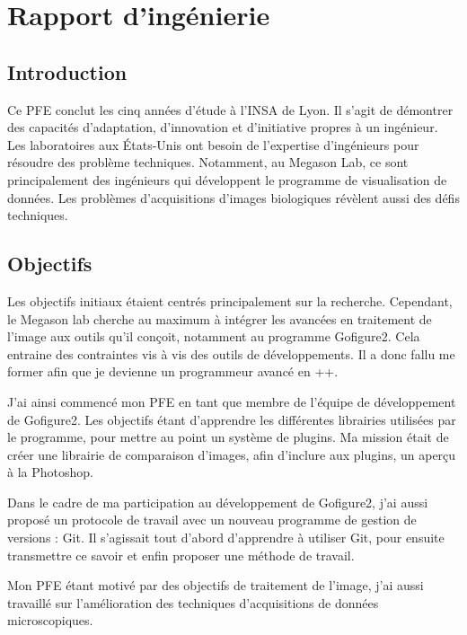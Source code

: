 

\chapter{Rapport d'ingénierie} 








\section*{Introduction}
Ce PFE conclut les cinq années d'étude à l'INSA de Lyon. 
Il s'agit de démontrer des capacités d'adaptation,
d'innovation et d'initiative propres à un ingénieur. Les laboratoires aux 
États-Unis ont besoin de l'expertise d'ingénieurs
pour résoudre des problème techniques. 
Notamment, au Megason Lab, ce sont principalement des ingénieurs qui développent le programme de visualisation de données. 
Les problèmes d'acquisitions d'images biologiques révèlent aussi des défis techniques.
 
\section*{Objectifs}

Les objectifs initiaux étaient centrés principalement sur la recherche.
Cependant, le Megason lab cherche au maximum à intégrer les avancées en traitement de l'image aux outils qu'il conçoit,
 notamment au programme Gofigure2. Cela entraine des contraintes vis à vis des outils de développements. 
 Il a donc fallu me former afin que je devienne un programmeur avancé en {\C++}. 
 
J'ai ainsi commencé mon PFE en tant que membre de l'équipe de développement de Gofigure2.
 Les objectifs étant d'apprendre les différentes librairies utilisées par le programme, pour mettre au point un système de plugins. 
 Ma mission était de créer une librairie de comparaison d'images, afin d'inclure aux plugins, un aperçu à la Photoshop.

Dans le cadre de ma participation au développement de Gofigure2,
 j'ai aussi proposé un protocole de travail avec un nouveau programme de gestion de versions : Git.
 Il s'agissait tout d'abord d'apprendre à utiliser Git, pour ensuite transmettre ce savoir et enfin proposer une méthode de travail.

Mon PFE étant motivé par des objectifs de traitement de l'image, j'ai aussi travaillé sur l'amélioration
 des techniques d'acquisitions de données microscopiques.

